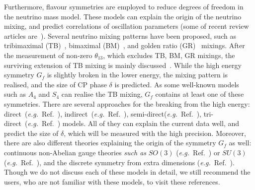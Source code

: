 \documentclass[aps,prd,nofootinbib,preprint]{revtex4}
\begin{document}
Furthermore, flavour symmetries are employed to reduce degrees of freedom in the neutrino mass model. These models can explain the origin of the neutrino mixing, and predict correlations of oscillation parameters (some of recent review articles are~\cite{Altarelli:2010gt,Ishimori:2010au,King:2013eh,King:2014nza,King:2015aea,King:2015ata,King:2017guk}). {\color{blue}
Several neutrino mixing patterns have been proposed, such as tribimaximal (TB)~\cite{Harrison:2002er,Xing:2002sw}, bimaximal (BM)~\cite{Fukugita:1998vn,Barger:1998ta,Davidson:1998bi}, and golden ratio (GR)~\cite{Datta:2003qg,Everett:2008et,Feruglio:2011qq} mixings. After the measurement of non-zero $\theta_{13}$, which excludes TB, BM, GR mixings, the surviving extension of TB mixing is mainly discussed~\cite{Harrison:2002er,King:2007pr,Pakvasa:2007zj}.
While the high energy symmetry $G_f$ is slightly broken in the lower energy, the mixing pattern is realised, and the size of CP phase $\delta$ is predicted. 
As some well-known models such as $A_4$ and $S_4$ can realise the TB mixing, $G_f$ contains at least one of these symmetries. There are several approaches for the breaking from the high energy: direct~(\textit{e.g.}~Ref.~\cite{King:2013eh}), indirect~(\textit{e.g.}~Ref.~\cite{King:2013eh}), semi-direct(\textit{e.g.}~Ref.~\cite{Holthausen:2012dk,Feruglio:2012cw,Feruglio:2013hia,Ding:2013hpa,Ding:2013bpa}), tri-direct~(\textit{e.g.}~Ref.~\cite{Ding:2018fyz,Ding:2018tuj}) models. All of they can explain the current data well, and predict the size of $\delta$, which will be measured with the high precision. Moreover, there are also different theories explaining the origin of the symmetry $G_f$ as well: continuous non-Abelian gauge theories \textit{such as} $SO(3)$ (\textit{e.g.}~Ref.~\cite{King:2005bj}) or $SU(3)$ (\textit{e.g.}~Ref.~\cite{King:2001uz,King:2003rf}), and the discrete symmetry from extra dimensions (\textit{e.g.}~Ref.~\cite{Feruglio:2017spp,Criado:2018thu,Penedo:2018nmg}).
%
Though we do not discuss each of these models in detail, we still recommend the users, who are not familiar with these models, to visit these references.
 }
\end{document}
